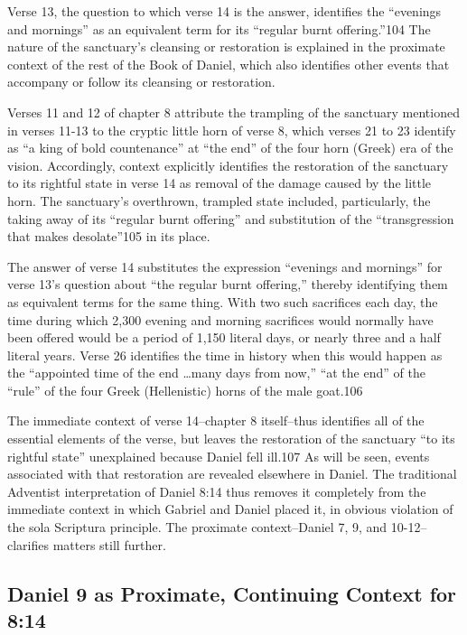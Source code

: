 Verse 13, the question to which verse 14 is the answer, identifies the
``evenings and mornings'' as an equivalent term for its ``regular burnt
offering.''104 The nature of the sanctuary's cleansing or restoration is
explained in the proximate context of the rest of the Book of Daniel, which
also identifies other events that accompany or follow its cleansing or
restoration.

Verses 11 and 12 of chapter 8 attribute the trampling of the sanctuary
mentioned in verses 11-13 to the cryptic little horn of verse 8, which
verses 21 to 23 identify as ``a king of bold countenance'' at ``the end'' of the
four horn (Greek) era of the vision. Accordingly, context explicitly
identifies the restoration of the sanctuary to its rightful state in verse
14 as removal of the damage caused by the little horn. The sanctuary's
overthrown, trampled state included, particularly, the taking away of its
``regular burnt offering'' and substitution of the ``transgression that makes
desolate''105 in its place.

The answer of verse 14 substitutes the expression ``evenings and mornings''
for verse 13's question about ``the regular burnt offering,'' thereby
identifying them as equivalent terms for the same thing. With two such
sacrifices each day, the time during which 2,300 evening and morning
sacrifices would normally have been offered would be a period of 1,150
literal days, or nearly three and a half literal years. Verse 26 identifies
the time in history when this would happen as the ``appointed time of the end
\ldots many days from now,'' ``at the end'' of the ``rule'' of the four Greek
(Hellenistic) horns of the male goat.106

The immediate context of verse 14--chapter 8 itself--thus identifies all
of the essential elements of the verse, but leaves the restoration of
the sanctuary ``to its rightful state'' unexplained because Daniel fell
ill.107 As will be seen, events associated with that restoration are
revealed elsewhere in Daniel. The traditional Adventist interpretation of
Daniel 8:14 thus removes it completely from the immediate context in which
Gabriel and Daniel placed it, in obvious violation of the sola Scriptura 
principle. The proximate context--Daniel 7, 9, and 10-12--clarifies
matters still further.

\subsection{Daniel 9 as Proximate, Continuing Context for 8:14}

